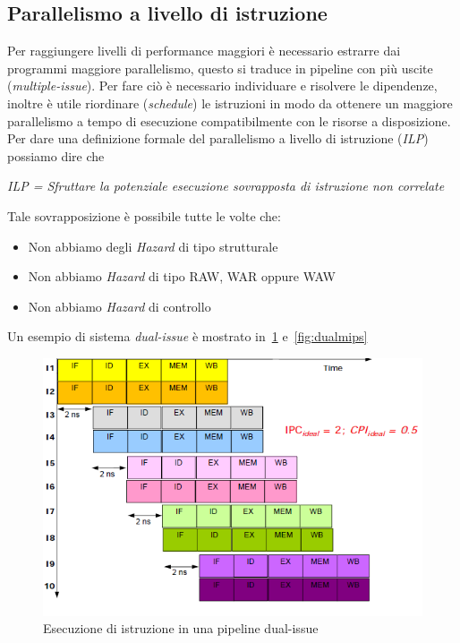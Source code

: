 \subsection{Parallelismo a livello di istruzione}
Per raggiungere livelli di performance maggiori è necessario estrarre dai programmi maggiore parallelismo, questo si traduce in pipeline con più uscite (\emph{multiple-issue}). Per fare ciò è necessario individuare e risolvere le dipendenze, inoltre è utile riordinare (\emph{schedule}) le istruzioni in modo da ottenere un maggiore parallelismo a tempo di esecuzione compatibilmente con le risorse a disposizione.\\
Per dare una definizione formale del parallelismo a livello di istruzione (\emph{ILP}) possiamo dire che 
\begin{center}
\textit{ILP = Sfruttare la potenziale esecuzione sovrapposta di istruzione non correlate}
\end{center}
Tale sovrapposizione è possibile tutte le volte che:
\begin{itemize}
\item Non abbiamo degli \emph{Hazard} di tipo strutturale
\item Non abbiamo \emph{Hazard} di tipo RAW, WAR oppure WAW
\item Non abbiamo \emph{Hazard} di controllo
\end{itemize}
Un esempio di sistema \emph{dual-issue} è mostrato in \figurename\,\ref{fig:dualpipe} e \figurename\,\ref{fig:dualmips}
\begin{figure}
\centering
\includegraphics[scale=0.5]{img/dualpipe.png}
\caption{Esecuzione di istruzione in una pipeline dual-issue}\label{fig:dualpipe}
\end{figure}
